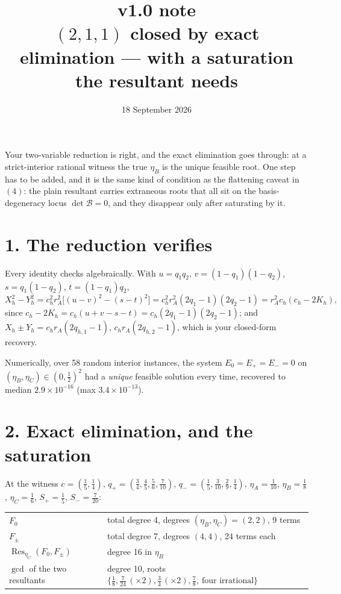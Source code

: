 \documentclass[11pt]{article}
\title{\textbf{v1.0 note}\\[2pt]
\large $(2,1,1)$ closed by exact elimination --- with a saturation the resultant needs}
\author{18 September 2026}
\date{}
\theoremstyle{remark}
\begin{document}
\maketitle
\vspace{-2.5em}

Your two-variable reduction is right, and the exact elimination goes through: at a strict-interior rational witness the true $\eta_B$ is the unique feasible root. One step has to be added, and it is the same kind of condition as the flattening caveat in $(4)$: the plain resultant carries extraneous roots that all sit on the basis-degeneracy locus $\det\mathcal B=0$, and they disappear only after saturating by it.

\section*{1. The reduction verifies}

Every identity checks algebraically. With $u=q_1q_2$, $v=(1-q_1)(1-q_2)$, $s=q_1(1-q_2)$, $t=(1-q_1)q_2$,
\[
X_h^2-Y_h^2=c_h^2r_A^2\bigl[(u-v)^2-(s-t)^2\bigr]=c_h^2r_A^2(2q_1-1)(2q_2-1)=r_A^2c_h(c_h-2K_h),
\]
since $c_h-2K_h=c_h(u+v-s-t)=c_h(2q_1-1)(2q_2-1)$; and $X_h\pm Y_h=c_hr_A(2q_{h,1}-1)$, $c_hr_A(2q_{h,2}-1)$, which is your closed-form recovery.

Numerically, over 58 random interior instances, the system $E_0=E_+=E_-=0$ on $(\eta_B,\eta_C)\in(0,\tfrac12)^2$ had a \emph{unique} feasible solution every time, recovered to median $2.9\times10^{-16}$ (max $3.4\times10^{-13}$).

\section*{2. Exact elimination, and the saturation}

At the witness $c=(\tfrac15,\tfrac14)$, $q_+=(\tfrac34,\tfrac45,\tfrac56,\tfrac7{10})$, $q_-=(\tfrac15,\tfrac3{10},\tfrac29,\tfrac14)$, $\eta_A=\tfrac1{10}$, $\eta_B=\tfrac18$, $\eta_C=\tfrac16$, $S_+=\tfrac15$, $S_-=\tfrac7{20}$:

\begin{center}\small
\begin{tabular}{@{}ll@{}}
\toprule
$F_0$ & total degree 4, degrees $(\eta_B,\eta_C)=(2,2)$, 9 terms\\
$F_\pm$ & total degree 7, degrees $(4,4)$, 24 terms each\\
$\operatorname{Res}_{\eta_C}(F_0,F_\pm)$ & degree 16 in $\eta_B$\\
$\gcd$ of the two resultants & degree 10, roots $\{\tfrac18,\tfrac7{24}\,(\times2),\tfrac34\,(\times2),\tfrac78,\ \text{four irrational}\}$\\
\bottomrule
\end{tabular}
\end{center}
\end{document}
